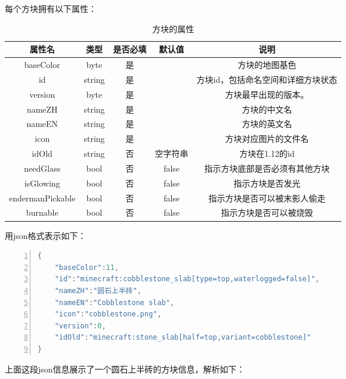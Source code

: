 \documentclass[UTF8]{ctexart}
\begin{document}
每个方块拥有以下属性：
\begin{table}[h]
    \centering
    \caption{方块的属性}
    \begin{tabular}{ccccc}
        \hline
        属性名           & 类型   & 是否必填 & 默认值   & 说明                               \\ \hline
        baseColor        & byte   & 是       &          & 方块的地图基色                     \\
        id               & string & 是       &          & 方块id，包括命名空间和详细方块状态 \\
        version          & byte   & 是       &          & 方块最早出现的版本。               \\
        nameZH           & string & 是       &          & 方块的中文名                       \\
        nameEN           & string & 是       &          & 方块的英文名                       \\
        icon             & string & 是       &          & 方块对应图片的文件名               \\
        idOld            & string & 否       & 空字符串 & 方块在1.12的id                     \\
        needGlass        & bool   & 否       & false    & 指示方块底部是否必须有其他方块     \\
        isGlowing        & bool   & 否       & false    & 指示方块是否发光                   \\
        endermanPickable & bool   & 否       & false    & 指示方块是否可以被末影人偷走       \\
        burnable         & bool   & 否       & false    & 指示方块是否可以被烧毁             \\
        \hline
    \end{tabular}
\end{table}

\clearpage
用json格式表示如下：
\begin{lstlisting}[language = C++, numbers=left, 
    numberstyle=\tiny,keywordstyle=\color{blue!70},
    commentstyle=\color{red!50!green!50!blue!50},frame=shadowbox,
    rulesepcolor=\color{red!20!green!20!blue!20},basicstyle=\ttfamily]
{
    "baseColor":11,
    "id":"minecraft:cobblestone_slab[type=top,waterlogged=false]",
    "nameZH":"圆石上半砖",
    "nameEN":"Cobblestone slab",
    "icon":"cobblestone.png",
    "version":0,
    "idOld":"minecraft:stone_slab[half=top,variant=cobblestone]"
}
    \end{lstlisting}
上面这段json信息展示了一个圆石上半砖的方块信息，解析如下：
\end{document}
